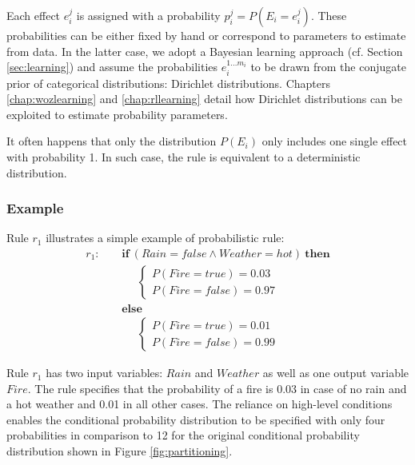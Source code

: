 Each effect $e_i^j$ is assigned with a probability $p_i^j = P(E_i = e_i^j)$.  These probabilities can be either 
fixed by hand or correspond to parameters to estimate from data. In the latter case, we adopt a Bayesian learning approach (cf. Section \ref{sec:learning}) and assume the probabilities $e_i^{1...m_i}$ to be drawn from the conjugate prior of categorical distributions: Dirichlet distributions. Chapters \ref{chap:wozlearning} and \ref{chap:rllearning} detail how Dirichlet distributions can be exploited to estimate probability parameters. 

It often happens that only the distribution $P(E_i)$ only includes one single effect with probability 1.  In such case, the rule is equivalent to a deterministic distribution. 

\subsubsection*{Example}

Rule $r_1$ illustrates a simple example of probabilistic rule:
\begin{align*}
r_1: \ \ \ \ \ & \textbf{if} \ (\mathit{Rain}\!=\!\mathit{false} \land \mathit{Weather}\!=\!\mathit{hot}) \ \textbf{then} \\
& \;\;\;\;\;  \begin{cases}
 P(\mathit{Fire}\!=\!\mathit{true}) = 0.03 \\ 
P(\mathit{Fire}\!=\!\mathit{false}) = 0.97
\end{cases} \\ 
& \textbf{else} \\
& \;\;\;\;\; \begin{cases}
P(\mathit{Fire}\!=\!\mathit{true}) = 0.01 \\
P(\mathit{Fire}\!=\!\mathit{false}) = 0.99
\end{cases} 
\end{align*}

Rule $r_1$ has two input variables: $\mathit{Rain}$ and $\mathit{Weather}$ as well as one output variable $\mathit{Fire}$. The rule specifies that the probability of a fire is 0.03 in case of no rain and a hot weather and 0.01 in all other cases.  The reliance on high-level conditions enables the conditional probability distribution to be specified with only four probabilities in comparison to 12 for the original conditional probability distribution shown in Figure \ref{fig:partitioning}. 

